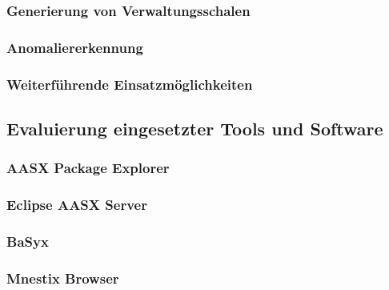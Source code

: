 \subsubsection{Generierung von Verwaltungsschalen}
\subsubsection{Anomaliererkennung}
\subsubsection{Weiterführende Einsatzmöglichkeiten}
\subsection{Evaluierung eingesetzter Tools und Software}
\subsubsection{AASX Package Explorer}
\subsubsection{Eclipse AASX Server}
\subsubsection{BaSyx}
\subsubsection{Mnestix Browser}